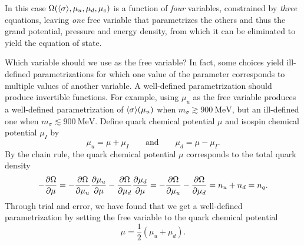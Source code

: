 In this case $\Omega(\langle \sigma \rangle,\mu_u,\mu_d,\mu_e)$ is a function of \emph{four} variables,
constrained by \emph{three} equations,
leaving \emph{one} free variable that parametrizes the others and thus the grand potential, pressure and energy density,
from which it can be eliminated to yield the equation of state.


Which variable should we use as the free variable?
In fact, some choices yield ill-defined parametrizations for which one value of the parameter corresponds to multiple values of another variable.
A well-defined parametrization should produce invertible functions.
For example, using $\mu_u$ as the free variable produces a well-defined parametrization of $\langle \sigma \rangle(\mu_u)$ when $m_\sigma \gtrsim \SI{900}{\mega\electronvolt}$, but an ill-defined one when $m_\sigma \lesssim \SI{900}{\mega\electronvolt}$.
Define quark chemical potential $\mu$ and isospin chemical potential $\mu_I$ by
\begin{equation}
	\mu_u = \mu + \mu_I
	\qquad \text{and} \qquad
	\mu_d = \mu - \mu_I .
\label{eq:lsm:quark_chemical_potential}
\end{equation}
By the chain rule, the quark chemical potential $\mu$ corresponds to the total quark density
\begin{equation}
	-\pdv{\Omega}{\mu} = -\pdv{\Omega}{\mu_u} \pdv{\mu_u}{\mu} - \pdv{\Omega}{\mu_d} \pdv{\mu_d}{\mu} = -\pdv{\Omega}{\mu_u} - \pdv{\Omega}{\mu_d} = n_u + n_d = n_q .
\end{equation}
Through trial and error, we have found that we get a well-defined parametrization by setting the free variable to the quark chemical potential
\begin{equation}
	\mu = \frac12 (\mu_u + \mu_d) .
\end{equation}

